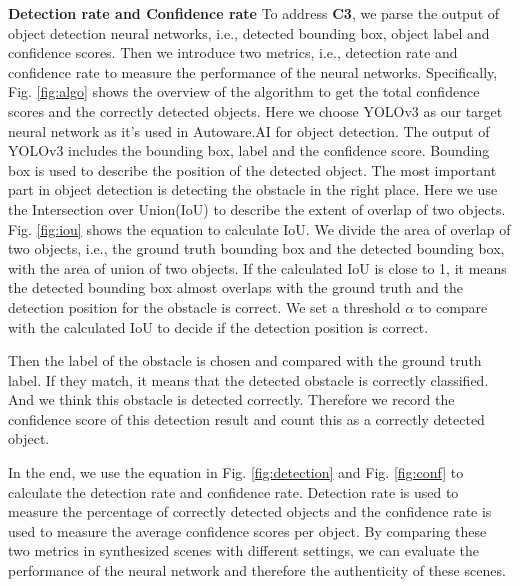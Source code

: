 \textbf{Detection rate and Confidence rate}
To address \textbf{C3}, we parse the output of object detection neural networks, i.e., detected bounding box, object label and confidence scores.
Then we introduce two metrics, i.e., detection rate and confidence rate to measure the performance of the neural networks.
Specifically, Fig. \ref{fig:algo} shows the overview of the algorithm to get the total confidence scores and the correctly detected objects.
Here we choose YOLOv3 as our target neural network as it's used in Autoware.AI\cite{autoware} for object detection. 
The output of YOLOv3 includes the bounding box, label and the confidence score.
Bounding box is used to describe the position of the detected object. 
The most important part in object detection is detecting the obstacle in the right place.
Here we use the Intersection over Union(IoU) to describe the extent of overlap of two objects.
Fig. \ref{fig:iou} shows the equation to calculate IoU.
We divide the area of overlap of two objects, i.e., the ground truth bounding box and the detected bounding box, with the area of union of two objects.
If the calculated IoU is close to 1, it means the detected bounding box almost overlaps with the ground truth and the detection position for the obstacle is correct.
We set a threshold $\alpha$ to compare with the calculated IoU to decide if the detection position is correct.

Then the label of the obstacle is chosen and compared with the ground truth label.
If they match, it means that the detected obstacle is correctly classified.
And we think this obstacle is detected correctly. 
Therefore we record the confidence score of this detection result and count this as a correctly detected object.

In the end, we use the equation in Fig. \ref{fig:detection} and Fig. \ref{fig:conf} to calculate the detection rate and confidence rate.
Detection rate is used to measure the percentage of correctly detected objects 
and the confidence rate is used to measure the average confidence scores per object.
By comparing these two metrics in synthesized scenes with different settings, 
we can evaluate the performance of the neural network and therefore the authenticity of these scenes.

